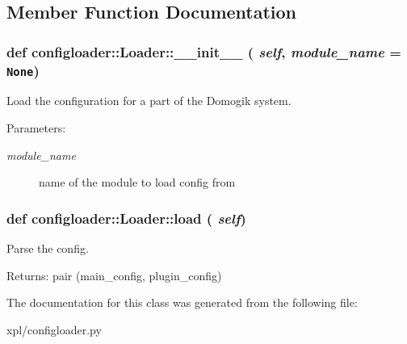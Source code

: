 \subsection{Member Function Documentation}
\hypertarget{classconfigloader_1_1Loader_f16abb85a49b17461dcc647f4a2d5e00}{
\subsubsection[\_\-\_\-init\_\-\_\-]{\setlength{\rightskip}{0pt plus 5cm}def configloader::Loader::\_\-\_\-init\_\-\_\- ( {\em self}, \/   {\em module\_\-name} = {\tt None})}}
\label{classconfigloader_1_1Loader_f16abb85a49b17461dcc647f4a2d5e00}


Load the configuration for a part of the Domogik system. 

\begin{Desc}
\item[Parameters:]
\begin{description}
\item[{\em module\_\-name}]name of the module to load config from \end{description}
\end{Desc}
\hypertarget{classconfigloader_1_1Loader_52f1433b0ea290e45661b7473c3a68d4}{
\subsubsection[load]{\setlength{\rightskip}{0pt plus 5cm}def configloader::Loader::load ( {\em self})}}
\label{classconfigloader_1_1Loader_52f1433b0ea290e45661b7473c3a68d4}


Parse the config. 

\begin{Desc}
\item[Returns:]pair (main\_\-config, plugin\_\-config) \end{Desc}


The documentation for this class was generated from the following file:\begin{CompactItemize}
\item 
xpl/configloader.py\end{CompactItemize}
